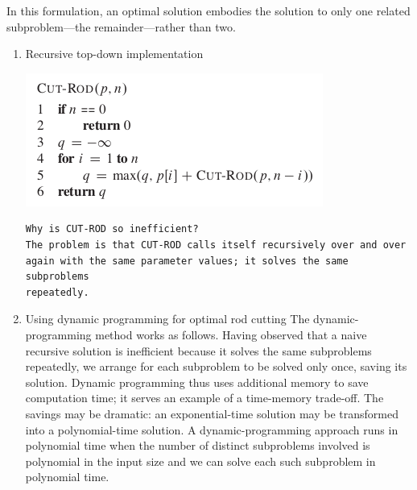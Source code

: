 \documentclass[11pt]{article}
\begin{document}
In this formulation, an optimal solution embodies the solution to only one related subproblem—the remainder—rather than two. \\
\begin{enumerate}
\item Recursive top-down implementation
\label{sec-5-1-1-1}

\includegraphics[width=.9\linewidth]{pics/c15_cut_rod.png} \\


\begin{verbatim}
Why is CUT-ROD so inefficient? 
The problem is that CUT-ROD calls itself recursively over and over 
again with the same parameter values; it solves the same subproblems 
repeatedly.
\end{verbatim}
\item Using dynamic programming for optimal rod cutting
\label{sec-5-1-1-2}
The dynamic-programming method works as follows. Having observed that a naive recursive solution is inefficient because it solves the same subproblems repeatedly, we arrange for each subproblem to be solved only once, saving its solution. Dynamic programming thus uses additional memory to save computation time; it serves an example of a time-memory trade-off. The savings may be dramatic: an exponential-time solution may be transformed into a polynomial-time solution. A dynamic-programming approach runs in polynomial time when the number of distinct subproblems involved is polynomial in the input size and we can solve each such subproblem in polynomial time. \\
\end{enumerate}
\end{document}

